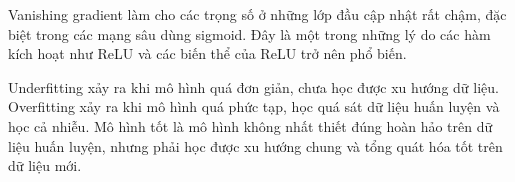 Vanishing gradient làm cho các trọng số ở những lớp đầu cập nhật rất chậm, đặc biệt trong các mạng sâu dùng sigmoid. Đây là một trong những lý do các hàm kích hoạt như ReLU và các biến thể của ReLU trở nên phổ biến.

Underfitting xảy ra khi mô hình quá đơn giản, chưa học được xu hướng dữ liệu. Overfitting xảy ra khi mô hình quá phức tạp, học quá sát dữ liệu huấn luyện và học cả nhiễu. Mô hình tốt là mô hình không nhất thiết đúng hoàn hảo trên dữ liệu huấn luyện, nhưng phải học được xu hướng chung và tổng quát hóa tốt trên dữ liệu mới.

